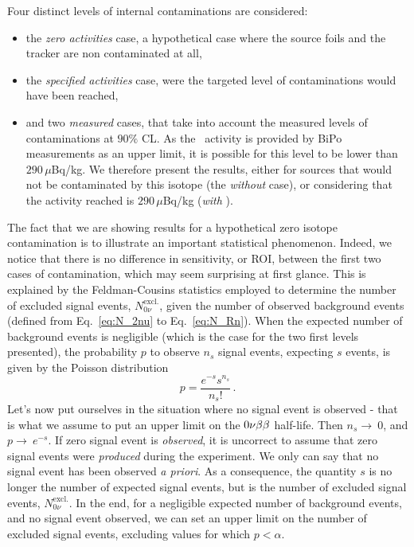 Four distinct levels of internal contaminations are considered:
\begin{itemize}
\item the \emph{zero activities} case, a hypothetical case where the source foils and the tracker are non contaminated at all,
\item the \emph{specified activities} case, were the targeted level of contaminations would have been reached,
\item and two \emph{measured} cases, that take into account the measured levels of contaminations at $90\%$ CL.
  As the \Bi\ activity is provided by BiPo measurements as an upper limit, it is possible for this level to be lower than $290\,\mu$Bq/kg.
  We therefore present the results, either for sources that would not be contaminated by this isotope (the \emph{without \Bi} case), or considering that the activity reached is $290\,\mu$Bq/kg (\emph{with \Bi}).
\end{itemize}
The fact that we are showing results for a hypothetical zero isotope contamination is to illustrate an important statistical phenomenon.
Indeed, we notice that there is no difference in sensitivity, or ROI, between the first two cases of contamination, which may seem surprising at first glance.
This is explained by the Feldman-Cousins statistics employed to determine the number of excluded signal events, $N_{0\nu}^{\text{excl.}}$, given the number of observed background events (defined from Eq.~\eqref{eq:N_2nu} to Eq.~\eqref{eq:N_Rn}).
When the expected number of background events is negligible (which is the case for the two first levels presented), the probability $p$ to observe $n_{s}$ signal events, expecting $s$ events, is given by the Poisson distribution
\begin{equation}
p = \frac{e^{-s}s^{n_{s}}}{n_{s}!}\,.
\end{equation}
Let's now put ourselves in the situation where no signal event is observed - that is what we assume to put an upper limit on the $0\nu\beta\beta$ half-life.
Then $n_{s}\rightarrow~0$, and $p\rightarrow~e^{-s}$.
If zero signal event is \emph{observed}, it is uncorrect to assume that zero signal events were \emph{produced} during the experiment.
We only can say that no signal event has been observed \emph{a priori}.
As a consequence, the quantity $s$ is no longer the number of expected signal events, but is the number of excluded signal events, $N_{0\nu}^{\text{excl.}}$.
In the end, for a negligible expected number of background events, and no signal event observed, we can set an upper limit on the number of excluded signal events, excluding values for which $p < \alpha$.
